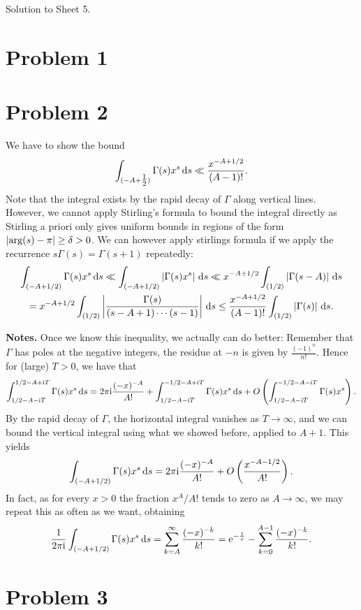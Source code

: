 \documentclass[a4paper,11pt]{article}
\author{Max von Consbruch}
\begin{document}
\begin{center}
    \huge{Solution to Sheet 5.}
\end{center}

\section*{Problem 1}

\section*{Problem 2}
We have to show the bound
\[
    \int_{(-A + \tfrac 12)} \Gamma(s) x^s \mathrm{\,d} s \ll \frac{x^{-A +
    1/2}}{(A-1)!}.
\]
Note that the integral exists by the rapid decay of $\Gamma$ along vertical
lines. However, we cannot apply Stirling's formula to bound the integral directly
as Stirling a priori only gives uniform bounds in regions of the form $\left\lvert \arg(s)
- \pi \right\rvert \geq \delta > 0$. We can however apply stirlings formula if we apply the recurrence
$s\Gamma(s) = \Gamma(s+1)$ repeatedly: 
\begin{multline*}
    \int_{(-A+1/2)} \Gamma(s) x^s \mathrm{\,d} s \ll 
    \int_{(-A+1/2)} \left\lvert \Gamma(s) x^s \right\rvert \mathrm{\,d} s \ll 
    x^{-A+1/2} \int_{(1/2)} \left\lvert \Gamma(s-A) \right\rvert \mathrm{\,d} s \\ 
    = x^{-A+1/2} \int_{(1/2)} \left\lvert \frac {\Gamma(s)}{(s-A+1) \cdots (s-1)} \right\rvert
    \mathrm{\,d} s \leq \frac{x^{-A + 1/2}}{(A-1)!} \int_{(1/2)} \left\lvert \Gamma(s) \right\rvert \mathrm{\,d} s. 
\end{multline*}

\textbf{Notes.}
Once we know this inequality, we actually can do better: Remember that $\Gamma$ has poles at
the negative integers, the residue at $-n$ is given by $\tfrac{(-1)^n}{n!}$. Hence for 
(large) $T > 0$, we have that 
\[
    \int_{1/2-A-\mathrm i T}^{1/2 - A +\mathrm i T} \Gamma(s) x^s \mathrm{\,d} s =
    2 \pi \mathrm i \frac{(-x)^{-A}}{A!} + \int_{1/2-A-\mathrm i T}^{-1/2 - A + \mathrm i T} \Gamma(s) x^s
    \mathrm{\,d} s + O\left( \int_{1/2-A-\mathrm i T}^{-1/2-A - \mathrm i T}  \Gamma(s) x^s \right). 
\]
By the rapid decay of $\Gamma$, the horizontal integral vanishes as $T
\rightarrow \infty$, and we can bound the vertical integral using what we
showed before, applied to $A+1$. This yields
\[
    \int_{(-A+1/2)} \Gamma(s) x^s \mathrm{\,d} s = 2 \pi \mathrm i \frac{(-x)^{-A}}{A!} + O\left(\frac{x^{-A-1/2}}{A!}\right).
\]
In fact, as for every $x>0$ the fraction $x^A/A!$ tends to zero as $A \to \infty$, we
may repeat this as often as we want, obtaining
\[
    \frac 1{2 \pi \mathrm i} \int_{(-A+1/2)} \Gamma(s) x^s \mathrm{\,d} s = \sum_{k=A}^\infty \frac{(-x)^{-k}}{k!} 
    = \mathrm e^{-\frac 1x} - \sum_{k=0}^{A-1} \frac{(-x)^{-k}}{k!}.
\]

\section*{Problem 3}
\end{document}
